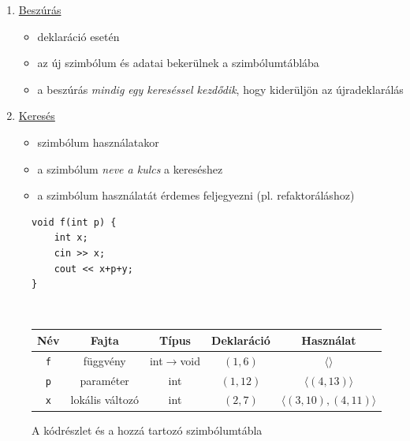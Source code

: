 \begin{enumerate}
	\item \underline{Beszúrás}
	
	\begin{itemize}
		\item deklaráció esetén
		\item az új szimbólum és adatai bekerülnek a szimbólumtáblába
		\item a beszúrás \textit{mindig egy kereséssel kezdődik}, hogy kiderüljön az újradeklarálás
	\end{itemize}
	
	\item \underline{Keresés}
	
	\begin{itemize}
		\item szimbólum használatakor
		\item a szimbólum \textit{neve a kulcs} a kereséshez
		\item a szimbólum használatát érdemes feljegyezni (pl. refaktoráláshoz)
	\end{itemize}
\end{enumerate}

\begin{figure}[h!]
	\begin{minipage}{0.275\linewidth}
		\begin{lstlisting}[style=cppstyle]
void f(int p) {
	int x;
	cin >> x;
	cout << x+p+y;
}
		\end{lstlisting}
	\end{minipage}
\begin{minipage}{0.01\linewidth}
	~
\end{minipage}
	\begin{minipage}{0.5\linewidth}
			\begin{tabular}{|c|c|c|c|c|}
				\hline
				\textbf{Név} & \textbf{Fajta} & \textbf{Típus} & \textbf{Deklaráció} & \textbf{Használat} \\
				\hline\hline
				\texttt{f} & függvény & int$\to$void & $(1,6)$ & $\langle\rangle$ \\
				\hline
				\texttt{p} & paraméter & int & $(1,12)$ & $\langle(4,13)\rangle$ \\
				\hline
				\texttt{x} & lokális változó & int & $(2,7)$ & $\langle(3,10), (4,11)\rangle$ \\
				\hline
			\end{tabular}
	\end{minipage}
	\caption{A kódrészlet és a hozzá tartozó szimbólumtábla}
\end{figure}

